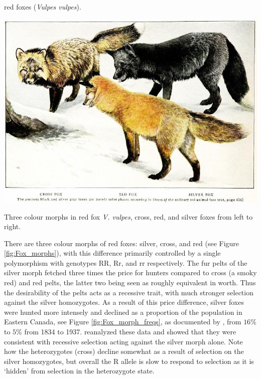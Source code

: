 red foxes ({\it Vulpes vulpes}). \begin{marginfigure}\begin{center}
  \includegraphics[width = \textwidth]{illustration_images/single_locus_selection/fox_morphs/fox_morphs_silver_cross.png}
\end{center}
\caption{Three colour morphs in red fox {\it V. vulpes}, cross, red,
  and silver foxes from left to right. } \label{fig:Fox_morphs}
\end{marginfigure}  There are three colour morphs of red foxes: silver, cross, and
red (see Figure \ref{fig:Fox_morphs}), with this difference primarily
controlled by a single polymorphism with genotypes RR, Rr, and rr respectively. The fur pelts of the silver morph
fetched three times the price for hunters compared to cross (a smoky red) and red
pelts, the latter two being seen as roughly equivalent in worth. Thus
the desirability of the pelts acts as a recessive trait, with much
stronger selection against the silver homozygotes.  As a
result of this price difference, silver foxes were hunted more
intensely and declined as a proportion of the population in Eastern Canada, see Figure
\ref{fig:Fox_morph_freqs}, as documented by \citeauthor{elton:42},
from $16\%$ to $5\%$ from 1834 to 1937.
\citeauthor{haldane:42} reanalyzed these data and showed that they
were consistent with recessive selection acting against the silver
morph alone. 
Note how the heterozygotes (cross) decline somewhat as a
result of selection on the silver homozygotes, but overall the R
allele is slow to respond to selection as it is `hidden' from
selection in the heterozygote state.

